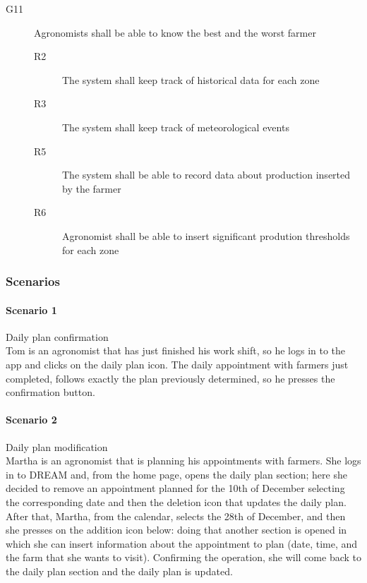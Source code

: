 \begin{description}
\begin{description}
    \end{description}
    \item [G11] Agronomists shall be able to know the best and the worst farmer
    \begin{description}
        \item[R2] The system shall keep track of historical data for each zone
        \item[R3] The system shall keep track of meteorological events
        \item[R5] The system shall be able to record data about production inserted by the farmer
        \item[R6] Agronomist shall be able to insert significant prodution thresholds for each zone   
    \end{description}
\end{description}

\bigskip
\subsubsection{Scenarios}
\paragraph{Scenario 1} Daily plan confirmation\\
Tom is an agronomist that has just finished his work shift, so he logs in to the app and clicks on the daily plan icon.
The daily appointment with farmers just completed, follows exactly the plan previously determined, so he presses the
confirmation button.

\bigskip
\paragraph{Scenario 2} Daily plan modification\\
Martha is an agronomist that is planning his appointments with farmers. She logs in to DREAM and, from the home page,
opens the daily plan section; here she decided to remove an appointment planned for the 10th of December selecting the
corresponding date and then the deletion icon that updates the daily plan. After that, Martha, from the calendar,
selects the 28th of December, and then she presses on the addition icon below: doing that another section is opened in
which she can insert information about the appointment to plan (date, time, and the farm that she wants to visit).
Confirming the operation, she will come back to the daily plan section and the daily plan is updated.

